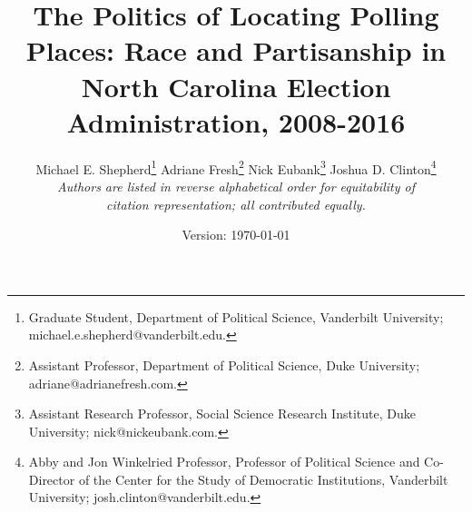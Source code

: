 \documentclass[12pt]{article}
\begin{document}
\onehalfspacing
\setlength{\parindent}{0.0in}
\setlength{\parskip}{.125in}





\title{The Politics of Locating Polling Places: Race and Partisanship in North Carolina Election Administration, 2008-2016}

\author{
Michael E. Shepherd\footnote{\footnotesize Graduate Student, Department of Political Science, Vanderbilt University; michael.e.shepherd@vanderbilt.edu.} \hspace*{.175in} Adriane Fresh\footnote{\footnotesize Assistant Professor, Department of Political Science, Duke University; adriane@adrianefresh.com. }\hspace*{.175in} Nick Eubank\footnote{\footnotesize Assistant Research Professor, Social Science Research Institute, Duke University; nick@nickeubank.com. } \hspace*{.175in}  Joshua D. Clinton\footnote{Abby and Jon Winkelried Professor, Professor of Political Science and Co-Director of the Center for the Study of Democratic Institutions, Vanderbilt University; josh.clinton@vanderbilt.edu. }  \\ \emph{\normalsize Authors are listed in reverse alphabetical order for equitability of } \\ \vspace*{-.1in} \emph{\normalsize citation representation; all contributed equally.} \vspace*{-.05in}}

\normalsize


\date{Version: \today  \\ \vspace*{.03in} }


\maketitle
\end{document}
